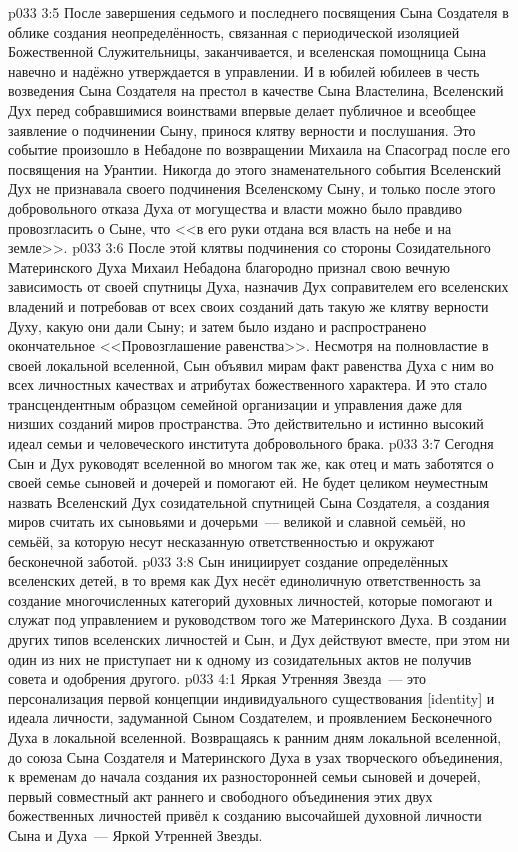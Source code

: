 \vs p033 3:5 После завершения седьмого и последнего посвящения Сына Создателя в облике создания неопределённость, связанная с периодической изоляцией Божественной Служительницы, заканчивается, и вселенская помощница Сына навечно и надёжно утверждается в управлении. И в юбилей юбилеев в честь возведения Сына Создателя на престол в качестве Сына Властелина, Вселенский Дух перед собравшимися воинствами впервые делает публичное и всеобщее заявление о подчинении Сыну, принося клятву верности и послушания. Это событие произошло в Небадоне по возвращении Михаила на Спасоград после его посвящения на Урантии. Никогда до этого знаменательного события Вселенский Дух не признавала своего подчинения Вселенскому Сыну, и только после этого добровольного отказа Духа от могущества и власти можно было правдиво провозгласить о Сыне, что <<в его руки отдана вся власть на небе и на земле>>.
\vs p033 3:6 После этой клятвы подчинения со стороны Созидательного Материнского Духа Михаил Небадона благородно признал свою вечную зависимость от своей спутницы Духа, назначив Дух соправителем его вселенских владений и потребовав от всех своих созданий дать такую же клятву верности Духу, какую они дали Сыну; и затем было издано и распространено окончательное <<Провозглашение равенства>>. Несмотря на полновластие в своей локальной вселенной, Сын объявил мирам факт равенства Духа с ним во всех личностных качествах и атрибутах божественного характера. И это стало трансцендентным образцом семейной организации и управления даже для низших созданий миров пространства. Это действительно и истинно высокий идеал семьи и человеческого института добровольного брака.
\vs p033 3:7 Сегодня Сын и Дух руководят вселенной во многом так же, как отец и мать заботятся о своей семье сыновей и дочерей и помогают ей. Не будет целиком неуместным назвать Вселенский Дух созидательной спутницей Сына Создателя, а создания миров считать их сыновьями и дочерьми~--- великой и славной семьёй, но семьёй, за которую несут несказанную ответственностью и окружают бесконечной заботой.
\vs p033 3:8 \pc Сын инициирует создание определённых вселенских детей, в то время как Дух несёт единоличную ответственность за создание многочисленных категорий духовных личностей, которые помогают и служат под управлением и руководством того же Материнского Духа. В создании других типов вселенских личностей и Сын, и Дух действуют вместе, при этом ни один из них не приступает ни к одному из созидательных актов не получив совета и одобрения другого.
\vs p033 4:1 Яркая Утренняя Звезда~--- это персонализация первой концепции индивидуального существования [identity] и идеала личности, задуманной Сыном Создателем, и проявлением Бесконечного Духа в локальной вселенной. Возвращаясь к ранним дням локальной вселенной, до союза Сына Создателя и Материнского Духа в узах творческого объединения, к временам до начала создания их разносторонней семьи сыновей и дочерей, первый совместный акт раннего и свободного объединения этих двух божественных личностей привёл к созданию высочайшей духовной личности Сына и Духа~--- Яркой Утренней Звезды.

